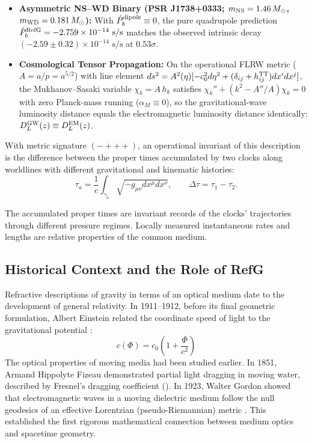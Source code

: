 \documentclass[11pt,a4paper]{article}
\begin{document}
\begin{enumerate}[label=\arabic*.]
\begin{itemize}
\item \textbf{Asymmetric NS--WD Binary (PSR J1738+0333; $m_{\rm NS} = 1.46\,M_\odot$, $m_{\rm WD} = 0.181\,M_\odot$):} With $\dot{P}_b^{\rm dipole} \equiv 0$, the pure quadrupole prediction $\dot{P}_b^{\rm RefG} = -2.759\times 10^{-14}\text{ s/s}$ matches the observed intrinsic decay $(-2.59 \pm 0.32)\times 10^{-14}\text{ s/s}$ at $0.53\sigma$.
\item \textbf{Cosmological Tensor Propagation:} On the operational FLRW metric ($A = a/p = a^{5/2}$) with line element $ds^2 = A^2(\eta)[-c_0^2 d\eta^2 + (\delta_{ij} + h^{\rm TT}_{ij})dx^i dx^j]$, the Mukhanov--Sasaki variable $\chi_k = A\,h_k$ satisfies $\chi_k'' + (k^2 - A''/A)\chi_k = 0$ with zero Planck-mass running ($\alpha_M \equiv 0$), so the gravitational-wave luminosity distance equals the electromagnetic luminosity distance identically: $D_L^{\rm GW}(z) \equiv D_L^{\rm EM}(z)$.
\end{itemize}
\end{enumerate}

With metric signature $(-+++)$, an operational invariant of this description is the difference between the proper times accumulated by two clocks along worldlines with different gravitational and kinematic histories:
\begin{equation}
\tau_a=\frac{1}{c}\int_{\gamma_a}\sqrt{-g_{\mu\nu}dx^\mu dx^\nu},
\qquad
\Delta\tau=\tau_1-\tau_2.
\end{equation}

The accumulated proper times are invariant records of the clocks' trajectories through different pressure regimes. Locally measured instantaneous rates and lengths are relative properties of the common medium.

\subsection{Historical Context and the Role of RefG}

Refractive descriptions of gravity in terms of an optical medium date to the development of general relativity. In 1911--1912, before its final geometric formulation, Albert Einstein related the coordinate speed of light to the gravitational potential \citep{einstein1911,einstein1912}:
\begin{equation}
c(\Phi) = c_0 \left(1 + \frac{\Phi}{c^2}\right)
\end{equation}
The optical properties of moving media had been studied earlier. In 1851, Armand Hippolyte Fizeau demonstrated partial light dragging in moving water, described by Fresnel's dragging coefficient (\citealt{fizeau1851}). In 1923, Walter Gordon showed that electromagnetic waves in a moving dielectric medium follow the null geodesics of an effective Lorentzian (pseudo-Riemannian) metric \citep{gordon1923}. This established the first rigorous mathematical connection between medium optics and spacetime geometry.
\end{document}
